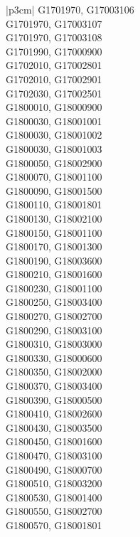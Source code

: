 \begin{customLongTable}{ |p{3cm}| }
G1701970, G17003106 \\ \hline
G1701970, G17003107 \\ \hline
G1701970, G17003108 \\ \hline
G1701990, G17000900 \\ \hline
G1702010, G17002801 \\ \hline
G1702010, G17002901 \\ \hline
G1702030, G17002501 \\ \hline
G1800010, G18000900 \\ \hline
G1800030, G18001001 \\ \hline
G1800030, G18001002 \\ \hline
G1800030, G18001003 \\ \hline
G1800050, G18002900 \\ \hline
G1800070, G18001100 \\ \hline
G1800090, G18001500 \\ \hline
G1800110, G18001801 \\ \hline
G1800130, G18002100 \\ \hline
G1800150, G18001100 \\ \hline
G1800170, G18001300 \\ \hline
G1800190, G18003600 \\ \hline
G1800210, G18001600 \\ \hline
G1800230, G18001100 \\ \hline
G1800250, G18003400 \\ \hline
G1800270, G18002700 \\ \hline
G1800290, G18003100 \\ \hline
G1800310, G18003000 \\ \hline
G1800330, G18000600 \\ \hline
G1800350, G18002000 \\ \hline
G1800370, G18003400 \\ \hline
G1800390, G18000500 \\ \hline
G1800410, G18002600 \\ \hline
G1800430, G18003500 \\ \hline
G1800450, G18001600 \\ \hline
G1800470, G18003100 \\ \hline
G1800490, G18000700 \\ \hline
G1800510, G18003200 \\ \hline
G1800530, G18001400 \\ \hline
G1800550, G18002700 \\ \hline
G1800570, G18001801 \\ \hline

\end{customLongTable}
